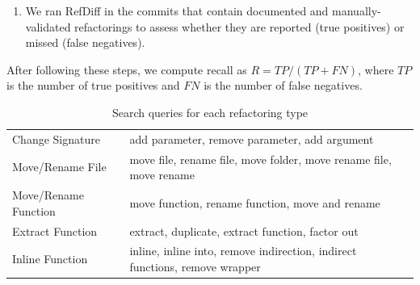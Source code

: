 \begin{enumerate}


\item We ran RefDiff in the commits that contain documented and manually-validated refactorings to assess whether they are reported (true positives) or missed (false negatives). 
\end{enumerate}

After following these steps, we compute recall as $R = \mathit{TP} / (\mathit{TP} + \mathit{FN})$, where $\mathit{TP}$ is the number of true positives and $\mathit{FN}$ is the number of false negatives.

\begin{table}[htbp]
\renewcommand{\arraystretch}{1.2}
\caption{Search queries for each refactoring type}
\label{TabSearchQueries}
\centering
\footnotesize
\begin{tabular}{@{}lp{7cm}@{}}
\toprule
Change Signature & add parameter, remove parameter, add argument \\
\addlinespace
Move/Rename File & move file, rename file, move folder, move rename file, move rename \\
\addlinespace
Move/Rename Function & move function, rename function, move and rename\\
\addlinespace
Extract Function & extract, duplicate, extract function, factor out \\
\addlinespace
Inline Function & inline, inline into, remove indirection, indirect functions, remove wrapper \\
\bottomrule
\end{tabular}
\end{table}



